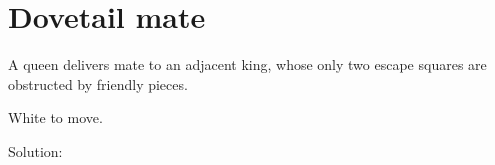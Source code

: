 \documentclass{book}
\begin{document}
\section{Dovetail mate}
A queen delivers mate to an adjacent king, whose only two escape squares are obstructed by friendly pieces.\begin{multicols}{2} 
\begin{samepage} 
\newgame 


 
\showboard
 
 White to move. 
 
Solution: 
 
\end{samepage}\end{multicols} 
\newpage 
\end{document}

